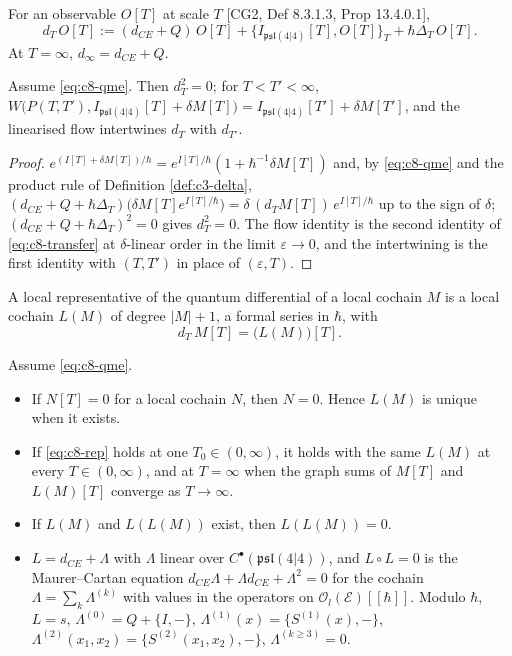 \begin{definition}
\label{def:c8-dT}
For an observable $O[T]$ at scale $T$ [CG2, Def 8.3.1.3, Prop 13.4.0.1],
\[
d_T\,O[T]:=(d_{CE}+Q)\,O[T]+\big\{I_{\mathfrak{psl}(4|4)}[T],O[T]\big\}_T+\hbar\Delta_T\,O[T].
\]
At $T=\infty$, $d_\infty=d_{CE}+Q$.
\end{definition}

\begin{lemma}
\label{lem:c8-flow}
Assume \eqref{eq:c8-qme}. Then $d_T^2=0$; for $T<T'<\infty$, $W\big(P(T,T'),I_{\mathfrak{psl}(4|4)}[T]+\delta M[T]\big)=I_{\mathfrak{psl}(4|4)}[T']+\delta M[T']$, and the linearised flow intertwines $d_T$ with $d_{T'}$.
\end{lemma}

\begin{proof}
$e^{(I[T]+\delta M[T])/\hbar}=e^{I[T]/\hbar}(1+\hbar^{-1}\delta M[T])$ and, by \eqref{eq:c8-qme} and the product rule of Definition \ref{def:c3-delta}, $(d_{CE}+Q+\hbar\Delta_T)\big(\delta M[T]e^{I[T]/\hbar}\big)=\delta\,(d_TM[T])\,e^{I[T]/\hbar}$ up to the sign of $\delta$; $(d_{CE}+Q+\hbar\Delta_T)^2=0$ gives $d_T^2=0$. The flow identity is the second identity of \eqref{eq:c8-transfer} at $\delta$-linear order in the limit $\varepsilon\to0$, and the intertwining is the first identity with $(T,T')$ in place of $(\varepsilon,T)$.
\end{proof}

\begin{definition}
\label{def:c8-rep}
A local representative of the quantum differential of a local cochain $M$ is a local cochain $L(M)$ of degree $|M|+1$, a formal series in $\hbar$, with
\begin{equation}
d_T\,M[T]=\big(L(M)\big)[T].
\label{eq:c8-rep}
\end{equation}
\end{definition}

\begin{theorem}
\label{thm:c8-L}
Assume \eqref{eq:c8-qme}.
\begin{itemize}
\item[(i)] If $N[T]=0$ for a local cochain $N$, then $N=0$. Hence $L(M)$ is unique when it exists.
\item[(ii)] If \eqref{eq:c8-rep} holds at one $T_0\in(0,\infty)$, it holds with the same $L(M)$ at every $T\in(0,\infty)$, and at $T=\infty$ when the graph sums of $M[T]$ and $L(M)[T]$ converge as $T\to\infty$.
\item[(iii)] If $L(M)$ and $L(L(M))$ exist, then $L(L(M))=0$.
\item[(iv)] $L=d_{CE}+\Lambda$ with $\Lambda$ linear over $C^\bullet(\mathfrak{psl}(4|4))$, and $L\circ L=0$ is the Maurer--Cartan equation $d_{CE}\Lambda+\Lambda d_{CE}+\Lambda^2=0$ for the cochain $\Lambda=\sum_k\Lambda^{(k)}$ with values in the operators on $\mathscr O_l(\mathscr E)[[\hbar]]$. Modulo $\hbar$, $L=s$, $\Lambda^{(0)}=Q+\{I,-\}$, $\Lambda^{(1)}(x)=\{S^{(1)}(x),-\}$, $\Lambda^{(2)}(x_1,x_2)=\{S^{(2)}(x_1,x_2),-\}$, $\Lambda^{(k\ge3)}=0$.
\end{itemize}
\end{theorem}

